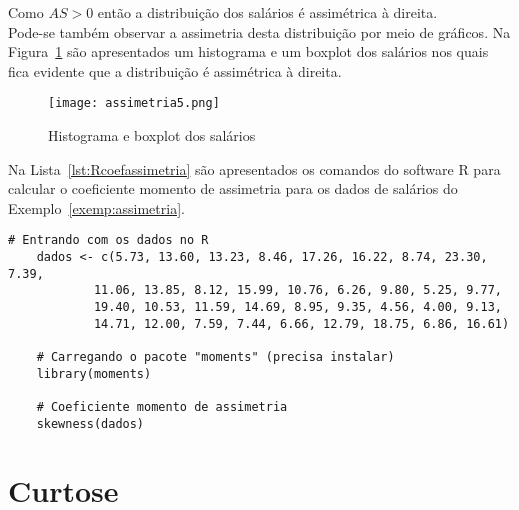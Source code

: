 \documentclass[11pt,fleqn]{book} %
\begin{document}
\begin{example}
\vspace{0,2cm}

Como $AS>0$ então a distribuição dos salários é assimétrica à direita.\\	


Pode-se também observar a assimetria desta distribuição por meio de gráficos. Na Figura~\ref{fig:histboxplotsalarios} são apresentados um histograma e um boxplot dos salários nos quais fica evidente que a distribuição é assimétrica à direita. \\ 

	
	\begin{figure}[h!]
	\centering\texttt{[image: assimetria5.png]}
	\caption{Histograma e boxplot dos salários}
	\label{fig:histboxplotsalarios} %
	\end{figure}
	
		 
\end{example}


\vspace{0,3cm}


Na Lista~\ref{lst:Rcoefassimetria} são apresentados os comandos do software R para calcular o coeficiente momento de assimetria para os dados de salários do Exemplo~\ref{exemp:assimetria}. \\

\begin{scriptsize}
	\estiloR
	\begin{lstlisting}[caption={Comandos do software R}, label=lst:Rcoefassimetria]
	# Entrando com os dados no R
	dados <- c(5.73, 13.60, 13.23, 8.46, 17.26, 16.22, 8.74, 23.30, 7.39,
			11.06, 13.85, 8.12, 15.99, 10.76, 6.26, 9.80, 5.25, 9.77,
			19.40, 10.53, 11.59, 14.69, 8.95, 9.35, 4.56, 4.00, 9.13,
			14.71, 12.00, 7.59, 7.44, 6.66, 12.79, 18.75, 6.86, 16.61)

	# Carregando o pacote "moments" (precisa instalar)
	library(moments)
	
	# Coeficiente momento de assimetria
	skewness(dados)

	\end{lstlisting}
\end{scriptsize}








\section{Curtose}
\end{document}
